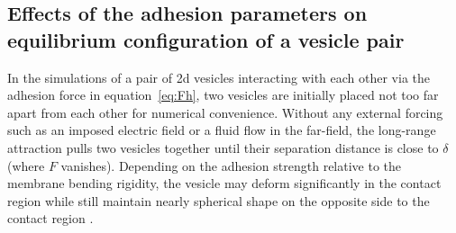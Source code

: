 \documentclass[%
preprint,
 amsmath,amssymb,
 aps,
]{revtex4-1}
\begin{document}
\subsection{Effects of the adhesion parameters on equilibrium configuration of a vesicle pair}
\label{subsec:qflow_adhesion_parameters} 
In the simulations of a pair of 2d vesicles interacting with each other via the adhesion force in equation~\ref{eq:Fh},
two vesicles are initially placed not too far apart  from each other for numerical convenience. 
Without any external forcing such as an imposed electric field or a fluid flow in the far-field, the long-range attraction pulls two vesicles together until their
separation distance is close to $\delta$ (where $F$ vanishes).  Depending on the adhesion strength relative to the membrane bending rigidity, the vesicle may deform significantly in the contact
region while still maintain nearly spherical shape on the opposite side to the contact region \cite{EvansMetcalfe1984_BJ,Book_PhysicalBasisCellAdhesion,Book_IntermolecularSurfaceForces,RamachandranAndersonLealIsraelachvili2010_Langmuir}.
\end{document}
